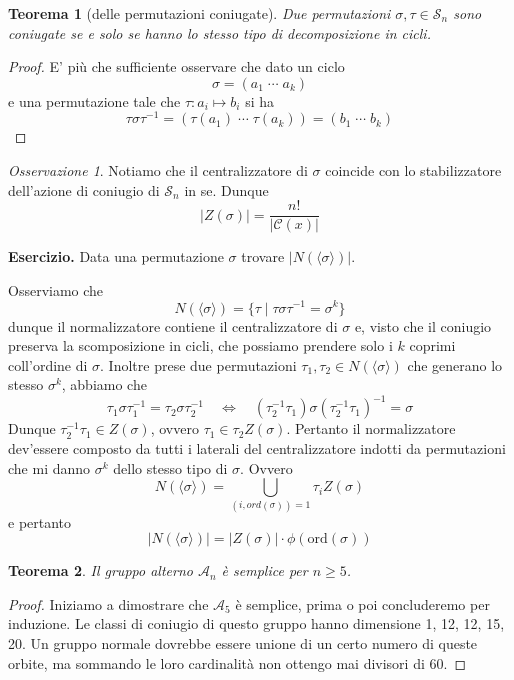 \documentclass[a4paper]{article}
\newtheorem{theorem}{Teorema}[section]
\theoremstyle{remark}
\newtheorem*{remark}{Osservazione}
\theoremstyle{definition}
\newcommand{\gen}[1]{\langle #1 \rangle}
\begin{document}
\begin{multicols}{2}
\begin{theorem}[delle permutazioni coniugate]
	Due permutazioni $ \sigma, \tau \in \mathcal{S}_n $ sono coniugate se e solo se hanno lo stesso tipo di decomposizione in cicli.
\end{theorem}
\begin{proof}
	E' più che sufficiente osservare che dato un ciclo $$  \sigma = (a_1 \; \cdots \; a_k)  $$ e una permutazione tale che $ \tau : a_i \mapsto b_i $ si ha
	\[\tau\sigma\tau^{-1} = (\tau(a_1) \; \cdots \; \tau(a_k)) = (b_1 \; \cdots \; b_k) \]
\end{proof}

\begin{remark}
	Notiamo che il centralizzatore di $ \sigma $ coincide con lo stabilizzatore dell'azione di coniugio di $ \mathcal{S}_n $ in se. Dunque
	\[ |Z(\sigma)| = \frac{n!}{|\mathcal{C}(x)|} \]
\end{remark}
\textbf{Esercizio.} Data una permutazione $ \sigma $ trovare $ |N(\langle \sigma \rangle)| $.

Osserviamo che
\[ N(\gen{\sigma}) = \{ \tau \mid \tau\sigma\tau^{-1} = \sigma^k \} \]
dunque il normalizzatore contiene il centralizzatore di $ \sigma $ e, visto che il coniugio preserva la scomposizione in cicli, che possiamo prendere solo i $ k $ coprimi coll'ordine di $ \sigma $. Inoltre prese due permutazioni $ \tau_1, \tau_2 \in N(\gen{\sigma})$ che generano lo stesso $ \sigma^k $, abbiamo che
\[ \tau_1 \sigma \tau_1 ^{-1} = \tau_2 \sigma \tau_2 ^{-1} \quad\Leftrightarrow\quad (\tau_2^{-1}\tau_1) \sigma (\tau_2^{-1}\tau_1) ^{-1} = \sigma \]
Dunque $ \tau_2^{-1}\tau_1 \in Z(\sigma) $, ovvero $ \tau_1 \in \tau_2 Z(\sigma) $. Pertanto il normalizzatore dev'essere composto da tutti i laterali del centralizzatore indotti da permutazioni che mi danno $ \sigma^k $ dello stesso tipo di $ \sigma $.
Ovvero
\[ N(\gen{\sigma}) = \bigcup_{(i, ord(\sigma))= 1} \tau_i Z(\sigma) \]
e pertanto
\[ |N(\gen{\sigma})| = |Z(\sigma)| \cdot \phi(\text{ord}(\sigma)) \]

\begin{theorem}
	Il gruppo alterno $ \mathcal{A}_n $ è semplice per $ n \geq 5 $.
\end{theorem}
\begin{proof}
	Iniziamo a dimostrare che $ \mathcal{A}_5 $ è semplice, prima o poi concluderemo per induzione. Le classi di coniugio di questo gruppo hanno dimensione 1, 12, 12, 15, 20. Un gruppo normale dovrebbe essere unione di un certo numero di queste orbite, ma sommando le loro cardinalità non ottengo mai divisori di 60.
\end{proof}


\end{multicols}
\end{document}
